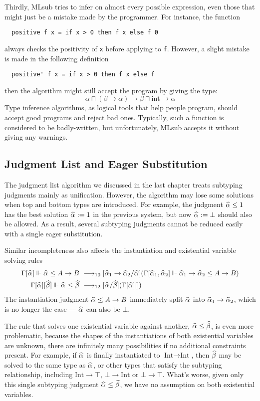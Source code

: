 Thirdly, MLsub tries to infer on almost every possible expression,
even those that might just be a mistake made by the programmer.
For instance, the function
\begin{verbatim}
  positive f x = if x > 0 then f x else f 0
\end{verbatim}
always checks the positivity of \verb|x| before applying to \verb|f|.
However, a slight mistake is made in the following definition
\begin{verbatim}
  positive' f x = if x > 0 then f x else f
\end{verbatim}
then the algorithm might still accept the program by giving the type:
$$\alpha \sqcap (\beta \to \alpha) \to \beta \sqcap \text{int} \to \alpha$$
Type inference algorithms, as logical tools that help people program,
should accept good programs and reject bad ones.
Typically, such a function is considered to be badly-written,
but unfortunately, MLsub accepts it without giving any warnings.

\subsection{Judgment List and Eager Substitution}

The judgment list algorithm we discussed in the last chapter treats subtyping
judgments mainly as unification.
However, the algorithm may lose some solutions
when top and bottom types are introduced.
For example,
the judgment $\al \le 1$ has the best solution
$\al := 1$ in the previous system,
but now $\al := \bot$ should also be allowed.
As a result, several subtyping judgments cannot be reduced easily with a single
eager substitution.

Similar incompleteness also affects the instantiation and
existential variable solving rules
\begin{gather*}
\begin{aligned}
    \Gm[\al] \Vdash \al \le A\to B &\rrule{10} [\al[1]\to\al[2]/\al] (\Gm[\al[1], \al[2]] \Vdash \al[1]\to \al[2] \le A \to B)\\
    \Gm[\al][\bt] \Vdash \al \le \bt &\rrule{12} [\al/\bt](\Gm[\al][])
\end{aligned}
\end{gather*}
The instantiation judgment $\al \le A \to B$ immediately split $\al$ into $\al[1] \to \al[2]$,
which is no longer the case --- $\al$ can also be $\bot$.

The rule that solves one existential variable against another,
$\al \le \bt$, is even more problematic,
because the shapes of the instantiations of both existential variables are unknown,
there are infinitely many possibilities if no additional constraints present.
For example, if $\al$ is finally instantiated to $\text{Int} \to \text{Int}$,
then $\bt$ may be solved to the same type as $\al$,
or other types that satisfy the subtyping relationship,
including $\text{Int} \to \top$, $\bot \to \text{Int}$ or $\bot \to \top$.
What's worse, given only this single subtyping judgment $\al \le \bt$,
we have no assumption on both existential variables.

